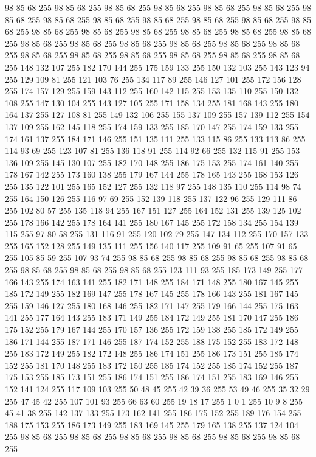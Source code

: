 98 85 68 255 98 85 68 255 98 85 68 255 98 85 68 255 98 85 68 255 98 85 68 255 98 85 68 255 98 85 68 255 98 85 68 255 98 85 68 255 98 85 68 255 98 85 68 255 98 85 68 255 98 85 68 255 98 85 68 255 98 85 68 255 98 85 68 255 98 85 68 255 98 85 68 255 98 85 68 255 98 85 68 255 98 85 68 255 98 85 68 255 98 85 68 255 98 85 68 255 98 85 68 255 98 85 68 255 98 85 68 255 98 85 68 255 98 85 68 255 98 85 68 255 148 132 107 255 182 170 144 255 175 159 133 255 150 132 103 255 143 123 94 255 129 109 81 255 121 103 76 255 134 117 89 255 146 127 101 255 172 156 128 255 174 157 129 255 159 143 112 255 160 142 115 255 153 135 110 255 150 132 108 255 147 130 104 255 143 127 105 255 171 158 134 255 181 168 143 255 180 164 137 255 127 108 81 255 149 132 106 255 155 137 109 255 157 139 112 255 154 137 109 255 162 145 118 255 174 159 133 255 185 170 147 255 174 159 133 255 174 161 137 255 184 171 146 255 151 135 111 255 133 115 86 255
133 113 86 255 114 93 69 255 123 107 81 255 136 118 91 255 114 92 66 255 132 115 91 255 153 136 109 255 145 130 107 255 182 170 148 255 186 175 153 255 174 161 140 255 178 167 142 255 173 160 138 255 179 167 144 255 178 165 143 255 168 153 126 255 135 122 101 255 165 152 127 255 132 118 97 255 148 135 110 255 114 98 74 255 164 150 126 255 116 97 69 255 152 139 118 255 137 122 96 255 129 111 86 255 102 80 57 255 135 118 94 255 167 151 127 255 164 152 131 255 139 125 102 255 178 166 142 255 178 164 141 255 180 167 145 255 172 158 134 255 154 139 115 255 97 80 58 255 131 116 91 255 120 102 79 255 147 134 112 255 170 157 133 255 165 152 128 255 149 135 111 255 156 140 117 255 109 91 65 255 107 91 65 255 105 85 59 255 107 93 74 255 98 85 68 255 98 85 68 255 98 85 68 255 98 85 68 255 98 85 68 255 98 85 68 255 98 85 68 255 123 111 93 255 185 173 149 255 177 166 143 255 174 163 141 255 182 171 148 255 184 171 148 255 180 167 145 255 185 172 149 255 182 169 147 255
178 167 145 255 178 166 143 255 181 167 145 255 159 146 127 255 180 168 146 255 182 171 147 255 179 166 144 255 175 163 141 255 177 164 143 255 183 171 149 255 184 172 149 255 181 170 147 255 186 175 152 255 179 167 144 255 170 157 136 255 172 159 138 255 185 172 149 255 186 171 144 255 187 171 146 255 187 174 152 255 188 175 152 255 183 172 148 255 183 172 149 255 182 172 148 255 186 174 151 255 186 173 151 255 185 174 152 255 181 170 148 255 183 172 150 255 185 174 152 255 185 174 152 255 187 175 153 255 185 173 151 255 186 174 151 255 186 174 151 255 183 169 146 255 152 141 124 255 117 109 103 255 50 48 45 255 42 39 36 255 53 49 46 255 35 32 29 255 47 45 42 255 107 101 93 255 66 63 60 255 19 18 17 255 1 0 1 255 10 9 8 255 45 41 38 255 142 137 133 255 173 162 141 255 186 175 152 255 189 176 154 255 188 175 153 255 186 173 149 255 183 169 145 255 179 165 138 255 137 124 104 255 98 85 68 255 98 85 68 255 98 85 68 255 98 85 68 255 98 85 68 255 98 85 68 255
